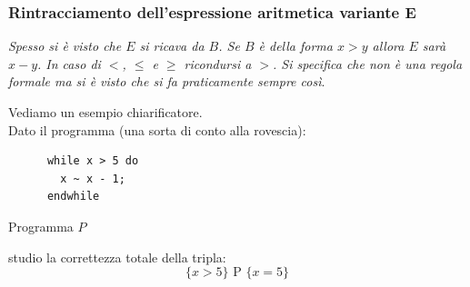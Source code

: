				      				\subsubsection{Rintracciamento dell'espressione aritmetica variante E}
				      				\textit{Spesso si è visto che $E$ si ricava da $B$. Se $B$ è della forma $x>y$ 
				      					allora $E$ sarà $x-y$. In caso di $<$, $\leq$ e $\geq$ ricondursi a $>$. Si 
				      					specifica che non è una regola formale ma si è visto che si fa praticamente 
				      					sempre così}.\\
				      				\begin{esempio}
				      					Vediamo un esempio chiarificatore.\\
				      					Dato il programma (una sorta di conto alla rovescia):
				      					\begin{listing}[H]
				      						\begin{lstlisting}
      while x > 5 do
        x ~ x - 1;
      endwhile  
				      						\end{lstlisting}
				      						\caption{Programma $P$}
				      						\label{E:t}
				      					\end{listing}
				      					studio la correttezza totale della tripla:
				      					\[\{x>5\}\mbox{ P }\{x=5\}\]

\end{esempio}
